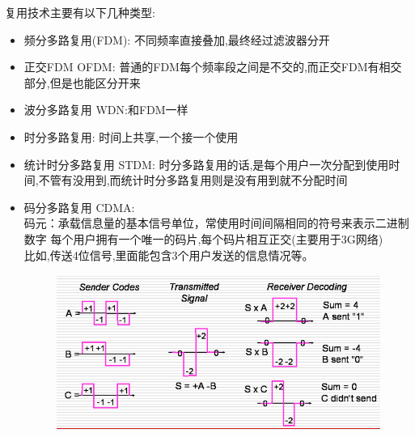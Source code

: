 \documentclass[UTF8,a4paper]{ctexart}
\begin{document}
  复用技术主要有以下几种类型:
  \begin{itemize}
    \item 频分多路复用(FDM):
    不同频率直接叠加,最终经过滤波器分开
    \item 正交FDM OFDM:
    普通的FDM每个频率段之间是不交的,而正交FDM有相交部分,但是也能区分开来
    \item 波分多路复用 WDN:和FDM一样
    \item 时分多路复用:
    时间上共享,一个接一个使用
    \item 统计时分多路复用 STDM:
    时分多路复用的话,是每个用户一次分配到使用时间,不管有没用到,而统计时分多路复用则是没有用到就不分配时间
    \item 码分多路复用 CDMA:\\
    码元：承载信息量的基本信号单位，常使用时间间隔相同的符号来表示二进制数字
    每个用户拥有一个唯一的码片,每个码片相互正交(主要用于3G网络)\\
    比如,传送4位信号,里面能包含3个用户发送的信息情况等。
    \begin{figure}[H]
      \centering
      \includegraphics[scale = 0.3]{assets/jisuanjiwangluo_93b08.png}
    \end{figure}
  \end{itemize}
\end{document}
